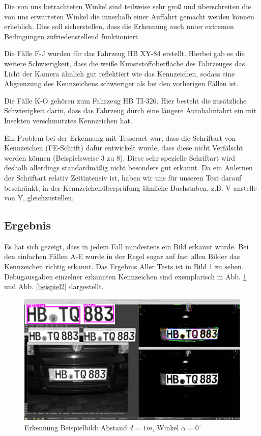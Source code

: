 \documentclass{../Vorlage/sebDenCls}
\begin{document}
Die von uns betrachteten Winkel sind teilweise sehr groß und überschreiten die von uns erwarteten Winkel die innerhalb einer Auffahrt gemacht werden können erheblich. Dies soll sicherstellen, dass die Erkennung auch unter extremen Bedingungen zufriedenstellend funktioniert.

Die Fälle F-J wurden für das Fahrzeug HB XY-84 erstellt. Hierbei gab es die weitere Schwierigkeit, dass die weiße Kunststoffoberfläche des Fahrzeuges das Licht der Kamera ähnlich gut reflektiert wie das Kennzeichen, sodass eine Abgrenzung des Kennzeichens schwieriger als bei den vorherigen Fällen ist.

Die Fälle K-O gehören zum Fahrzeug HB TI-326. Hier besteht die zusätzliche Schwierigkeit darin, dass das Fahrzeug durch eine längere Autobahnfahrt ein mit Insekten verschmutztes Kennzeichen hat.

Ein Problem bei der Erkennung mit Tesseract war, dass die Schriftart von Kennzeichen (FE-Schrift)  dafür entwickelt wurde, dass diese nicht Verfälscht werden können (Beispielsweise 3 zu 8). Diese sehr spezielle Schriftart wird deshalb allerdings standardmäßig nicht besonders gut erkannt. Da ein Anlernen der Schriftart relativ Zeitintensiv ist, haben wir uns für unseren Test darauf beschränkt, in der Kennzeichenüberprüfung ähnliche Buchstaben, z.B. V anstelle von Y, gleichzustellen.

\subsection{Ergebnis}
Es hat sich gezeigt, dass in jedem Fall mindestens ein Bild erkannt wurde. Bei den einfachen Fällen A-E wurde in der Regel sogar auf fast allen Bilder das Kennzeichen richtig erkannt. Das Ergebnis Aller Tests ist in Bild 1 zu sehen.
Debugausgaben einzelner erkannten Kennzeichen sind exemplarisch in Abb. \ref{beispiel} und Abb. \ref{beispiel2} dargestellt.

\begin{figure}[htp]
	\centering 	
	\includegraphics[width=.9\textwidth]{Funktioniert_1962.png} 
	\caption{Erkennung Beispielbild: Abstand $d=1m$, Winkel $\alpha = 0^\circ$ \label{beispiel}}
\end{figure}
\end{document}
